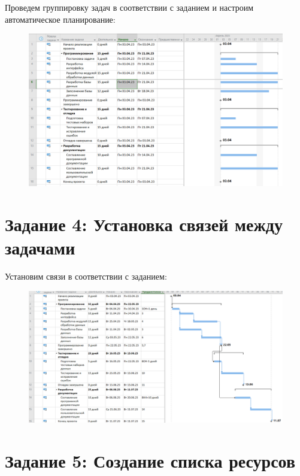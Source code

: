 Проведем группировку задач в соответствии с заданием и настроим автоматическое планирование:

\begin{figure}[H]
	\begin{center}
		\includegraphics[width=\textwidth]{imgs/task_3_0.png}
	\end{center}
\end{figure}

\section*{Задание 4: Установка связей между задачами}

Установим связи в соответствии с заданием:

\begin{figure}[H]
	\begin{center}
		\includegraphics[width=\textwidth]{imgs/task_4_0.png}
	\end{center}
\end{figure}

\section*{Задание 5: Создание списка ресурсов}


